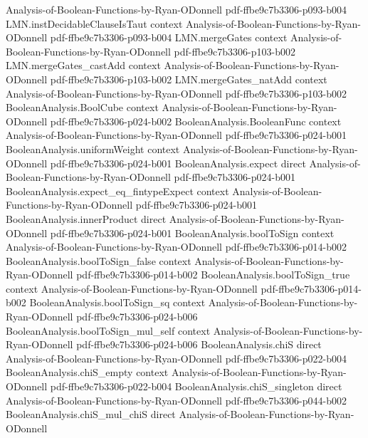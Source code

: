 \begin{lemma}
  {Analysis-of-Boolean-Functions-by-Ryan-ODonnell}
  {pdf-ffbe9c7b3306-p093-b004}
\proofstep
  {LMN.instDecidableClauseIsTaut}
  {context}
  {Analysis-of-Boolean-Functions-by-Ryan-ODonnell}
  {pdf-ffbe9c7b3306-p093-b004}
\proofstep
  {LMN.mergeGates}
  {context}
  {Analysis-of-Boolean-Functions-by-Ryan-ODonnell}
  {pdf-ffbe9c7b3306-p103-b002}
\proofstep
  {LMN.mergeGates_castAdd}
  {context}
  {Analysis-of-Boolean-Functions-by-Ryan-ODonnell}
  {pdf-ffbe9c7b3306-p103-b002}
\proofstep
  {LMN.mergeGates_natAdd}
  {context}
  {Analysis-of-Boolean-Functions-by-Ryan-ODonnell}
  {pdf-ffbe9c7b3306-p103-b002}
\proofstep
  {BooleanAnalysis.BoolCube}
  {context}
  {Analysis-of-Boolean-Functions-by-Ryan-ODonnell}
  {pdf-ffbe9c7b3306-p024-b002}
\proofstep
  {BooleanAnalysis.BooleanFunc}
  {context}
  {Analysis-of-Boolean-Functions-by-Ryan-ODonnell}
  {pdf-ffbe9c7b3306-p024-b001}
\proofstep
  {BooleanAnalysis.uniformWeight}
  {context}
  {Analysis-of-Boolean-Functions-by-Ryan-ODonnell}
  {pdf-ffbe9c7b3306-p024-b001}
\proofstep
  {BooleanAnalysis.expect}
  {direct}
  {Analysis-of-Boolean-Functions-by-Ryan-ODonnell}
  {pdf-ffbe9c7b3306-p024-b001}
\proofstep
  {BooleanAnalysis.expect_eq_fintypeExpect}
  {context}
  {Analysis-of-Boolean-Functions-by-Ryan-ODonnell}
  {pdf-ffbe9c7b3306-p024-b001}
\proofstep
  {BooleanAnalysis.innerProduct}
  {direct}
  {Analysis-of-Boolean-Functions-by-Ryan-ODonnell}
  {pdf-ffbe9c7b3306-p024-b001}
\proofstep
  {BooleanAnalysis.boolToSign}
  {context}
  {Analysis-of-Boolean-Functions-by-Ryan-ODonnell}
  {pdf-ffbe9c7b3306-p014-b002}
\proofstep
  {BooleanAnalysis.boolToSign_false}
  {context}
  {Analysis-of-Boolean-Functions-by-Ryan-ODonnell}
  {pdf-ffbe9c7b3306-p014-b002}
\proofstep
  {BooleanAnalysis.boolToSign_true}
  {context}
  {Analysis-of-Boolean-Functions-by-Ryan-ODonnell}
  {pdf-ffbe9c7b3306-p014-b002}
\proofstep
  {BooleanAnalysis.boolToSign_sq}
  {context}
  {Analysis-of-Boolean-Functions-by-Ryan-ODonnell}
  {pdf-ffbe9c7b3306-p024-b006}
\proofstep
  {BooleanAnalysis.boolToSign_mul_self}
  {context}
  {Analysis-of-Boolean-Functions-by-Ryan-ODonnell}
  {pdf-ffbe9c7b3306-p024-b006}
\proofstep
  {BooleanAnalysis.chiS}
  {direct}
  {Analysis-of-Boolean-Functions-by-Ryan-ODonnell}
  {pdf-ffbe9c7b3306-p022-b004}
\proofstep
  {BooleanAnalysis.chiS_empty}
  {context}
  {Analysis-of-Boolean-Functions-by-Ryan-ODonnell}
  {pdf-ffbe9c7b3306-p022-b004}
\proofstep
  {BooleanAnalysis.chiS_singleton}
  {direct}
  {Analysis-of-Boolean-Functions-by-Ryan-ODonnell}
  {pdf-ffbe9c7b3306-p044-b002}
\proofstep
  {BooleanAnalysis.chiS_mul_chiS}
  {direct}
  {Analysis-of-Boolean-Functions-by-Ryan-ODonnell}

\end{lemma}
